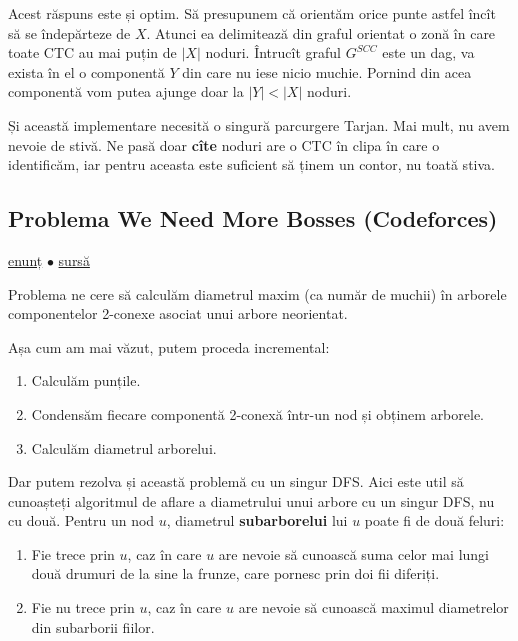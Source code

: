 \documentclass[../main.tex]{subfiles}
\begin{document}
Acest răspuns este și optim. Să presupunem că orientăm orice punte astfel încît să se îndepărteze de $X$. Atunci ea delimitează din graful orientat o zonă în care toate CTC au mai puțin de $|X|$ noduri. Întrucît graful $G^{SCC}$ este un dag, va exista în el o componentă $Y$ din care nu iese nicio muchie. Pornind din acea componentă vom putea ajunge doar la $|Y| < |X|$ noduri.

Și această implementare necesită o singură parcurgere Tarjan. Mai mult, nu avem nevoie de stivă. Ne pasă doar \textbf{cîte} noduri are o CTC în clipa în care o identificăm, iar pentru aceasta este suficient să ținem un contor, nu toată stiva.

\subsection{Problema We Need More Bosses (Codeforces)}
\label{problem:we-need-more-bosses}

\href{https://codeforces.com/contest/1000/problem/E}{enunț}
$\bullet$
\hyperref[code:we-need-more-bosses]{sursă}

Problema ne cere să calculăm diametrul maxim (ca număr de muchii) în arborele componentelor 2-conexe asociat unui arbore neorientat.

Așa cum am mai văzut, putem proceda incremental:

\begin{enumerate}
  \item Calculăm punțile.
  \item Condensăm fiecare componentă 2-conexă într-un nod și obținem arborele.
  \item Calculăm diametrul arborelui.
\end{enumerate}

Dar putem rezolva și această problemă cu un singur DFS. Aici este util să cunoașteți algoritmul de aflare a diametrului unui arbore cu un singur DFS, nu cu două. Pentru un nod $u$, diametrul \textbf{subarborelui} lui $u$ poate fi de două feluri:

\begin{enumerate}
  \item Fie trece prin $u$, caz în care $u$ are nevoie să cunoască suma celor mai lungi două drumuri de la sine la frunze, care pornesc prin doi fii diferiți.
  \item Fie nu trece prin $u$, caz în care $u$ are nevoie să cunoască maximul diametrelor din subarborii fiilor.
\end{enumerate}
\end{document}
